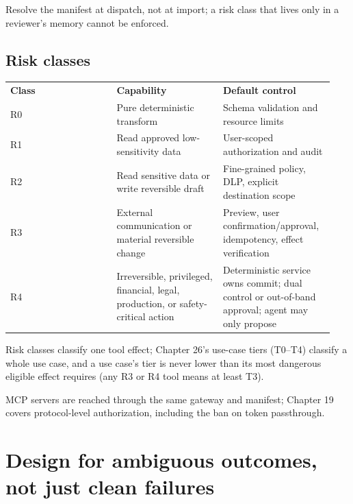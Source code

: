 Resolve the manifest at dispatch, not at import; a risk class that lives only in a reviewer's memory cannot be enforced.\par

\subsection{Risk classes}

\BookTableStart
\small
\begin{tabular}{@{}Y{0.3133\linewidth}Y{0.3133\linewidth}Y{0.3133\linewidth}@{}}
\color{white}\bfseries \textbf{Class} & \color{white}\bfseries \textbf{Capability} & \color{white}\bfseries \textbf{Default control} \\
R0 & Pure deterministic transform & Schema validation and resource limits \\
R1 & Read approved low-sensitivity data & User-scoped authorization and audit \\
R2 & Read sensitive data or write reversible draft & Fine-grained policy, DLP, explicit destination scope \\
R3 & External communication or material reversible change & Preview, user confirmation/approval, idempotency, effect verification \\
R4 & Irreversible, privileged, financial, legal, production, or safety-critical action & Deterministic service owns commit; dual control or out-of-band approval; agent may only propose \\
\end{tabular}
\BookTableEnd

Risk classes classify one tool effect; Chapter 26's use-case tiers (T0–T4) classify a whole use case, and a use case's tier is never lower than its most dangerous eligible effect requires (any R3 or R4 tool means at least T3).\par

MCP servers are reached through the same gateway and manifest; Chapter 19 covers protocol-level authorization, including the ban on token passthrough.\par

\section{Design for ambiguous outcomes, not just clean failures}


